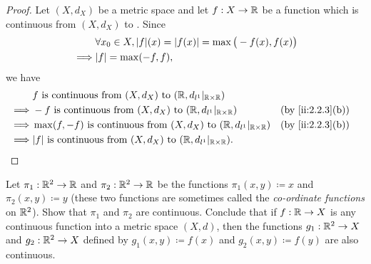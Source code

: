 \begin{proof}
  Let \((X, d_X)\) be a metric space and let \(f : X \to \mathbb{R}\) be a function which is continuous from \((X, d_X)\) to \(\).
  Since
  \begin{align*}
             & \forall x_0 \in X, \abs{f}(x) = \abs{f(x)} = \max\big(-f(x), f(x)\big) \\
    \implies & \abs{f} = \max(-f, f),
  \end{align*}
  we have
  \begin{align*}
             & f \text{ is continuous from } (X, d_X) \text{ to } (\R, d_{l^1}|_{\R \times \R})                              \\
    \implies & -f \text{ is continuous from } (X, d_X) \text{ to } (\R, d_{l^1}|_{\R \times \R})          &  & \by{ii:2.2.3}[b] \\
    \implies & \max(f, -f) \text{ is continuous from } (X, d_X) \text{ to } (\R, d_{l^1}|_{\R \times \R}) &  & \by{ii:2.2.3}[b] \\
    \implies & \abs{f} \text{ is continuous from } (X, d_X) \text{ to } (\R, d_{l^1}|_{\R \times \R}).
  \end{align*}
\end{proof}

\begin{ex}\label{ii:ex:2.2.4}
  Let \(\pi_1 : \mathbb{R}^2 \to \mathbb{R}\) and \(\pi_2 : \mathbb{R}^2 \to \mathbb{R}\) be the functions \(\pi_1(x, y) \coloneqq x\) and \(\pi_2(x, y) \coloneqq y\) (these two functions are sometimes called the \emph{co-ordinate functions} on \(\mathbb{R}^2\)).
  Show that \(\pi_1\) and \(\pi_2\) are continuous.
  Conclude that if \(f : \mathbb{R} \to X\) is any continuous function into a metric space \((X, d)\), then the functions \(g_1 : \mathbb{R}^2 \to X\) and \(g_2 : \mathbb{R}^2 \to X\) defined by \(g_1(x, y) \coloneqq f(x)\) and \(g_2(x, y) \coloneqq f(y)\) are also continuous.
\end{ex}

